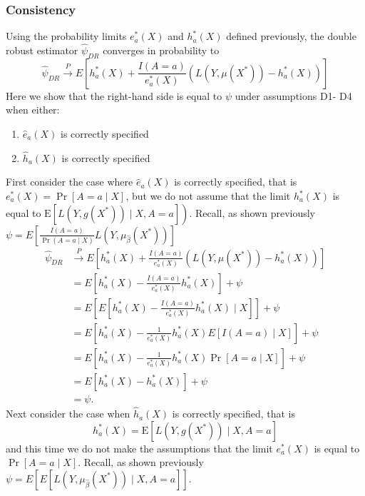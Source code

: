 \subsubsection{Consistency}
Using the probability limits $e_a^*(X)$ and $h_a^*(X)$ defined previously, the double robust estimator $\widehat{\psi}_{DR}$ converges in probability to 
$$\widehat{\psi}_{DR} \stackrel{P}{\longrightarrow} E\left[h^*_a(X)+\frac{I(A = a)}{e^*_a(X)}\left(L\left(Y, \mu\left(X^*\right)\right)-h^*_a(X)\right)\right]$$
Here we show that the right-hand side is equal to $\psi$ under assumptions D1-
D4 when either:
\begin{enumerate}
    \item $\widehat{e}_a(X)$ is correctly specified
    \item $\widehat{h}_a(X)$ is correctly specified
\end{enumerate}
First consider the case where $\widehat{e}_a(X)$ is correctly specified, that is $e^*_a(X)=\operatorname{Pr}[A=a \mid X]$, but we do not assume that the limit $h^*_a(X)$ is equal to $\left.\mathrm{E}\left[L\left(Y, g\left(X^*\right)\right) \mid X, A=a\right]\right)$. Recall, as shown previously $\psi = E\left[\frac{I(A = a)}{\Pr(A = a \mid X)}L(Y, \mu_{\widehat{\beta}}(X^*))\right] $
$$
\begin{aligned}
\widehat{\psi}_{DR} & \stackrel{P}{\rightarrow}  E\left[h^*_a(X)+\frac{I(A = a)}{e^*_a(X)}\left(L\left(Y, \mu\left(X^*\right)\right)-h^*_a(X)\right)\right] \\
& =E\left[h^*_a(X)-\frac{I(A = a)}{e^*_a(X)}h^*_a(X)\right]+\psi \\
& =E\left[E\left[h^*_a(X)-\frac{I(A = a)}{e^*_a(X)}h^*_a(X) \mid X \right]\right]+\psi \\
& =E\left[h^*_a(X)-\frac{1}{e^*_a(X)}h^*_a(X) E\left[I(A = a) \mid X \right]\right]+\psi \\
& =E\left[h^*_a(X)-\frac{1}{e^*_a(X)}h^*_a(X) \Pr\left[A = a \mid X \right]\right]+\psi \\
& =E\left[h^*_a(X)-h^*_a(X)\right]+\psi \\
& =\psi .
\end{aligned}
$$
Next consider the case when $\widehat{h}_a(X)$ is correctly specified, that is
$$
h^*_a(X)=\mathrm{E}\left[L\left(Y, g\left(X^*\right)\right) \mid X, A=a\right]
$$
and this time we do not make the assumptions that the limit $e^*_a(X)$ is equal to $\operatorname{Pr}[A=a \mid X]$. Recall, as shown previously $\psi = E\left[E\left[L(Y, \mu_{\widehat{\beta}}(X^*))\mid X, A = a\right]\right] $. 

